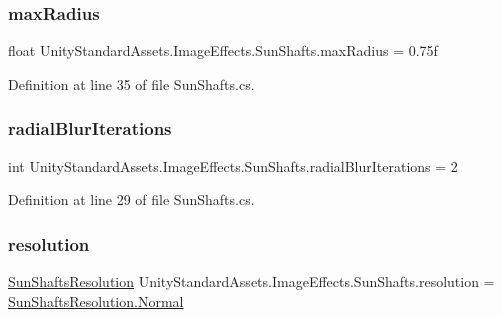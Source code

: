 \subsubsection{\texorpdfstring{max\+Radius}{maxRadius}}
{\footnotesize\ttfamily float Unity\+Standard\+Assets.\+Image\+Effects.\+Sun\+Shafts.\+max\+Radius = 0.\+75f}



Definition at line 35 of file Sun\+Shafts.\+cs.

\mbox{\label{class_unity_standard_assets_1_1_image_effects_1_1_sun_shafts_adbae1dcf55616fe0222523185cb6f41d}} 
\subsubsection{\texorpdfstring{radial\+Blur\+Iterations}{radialBlurIterations}}
{\footnotesize\ttfamily int Unity\+Standard\+Assets.\+Image\+Effects.\+Sun\+Shafts.\+radial\+Blur\+Iterations = 2}



Definition at line 29 of file Sun\+Shafts.\+cs.

\mbox{\label{class_unity_standard_assets_1_1_image_effects_1_1_sun_shafts_ac4e64d63f2b6f76426ab12a22fc36e3d}} 
\subsubsection{\texorpdfstring{resolution}{resolution}}
{\footnotesize\ttfamily \mbox{\hyperlink{class_unity_standard_assets_1_1_image_effects_1_1_sun_shafts_a6a2e4e71e122d0845ba712e1f3f36b21}{Sun\+Shafts\+Resolution}} Unity\+Standard\+Assets.\+Image\+Effects.\+Sun\+Shafts.\+resolution = \mbox{\hyperlink{class_unity_standard_assets_1_1_image_effects_1_1_sun_shafts_a6a2e4e71e122d0845ba712e1f3f36b21a960b44c579bc2f6818d2daaf9e4c16f0}{Sun\+Shafts\+Resolution.\+Normal}}}



